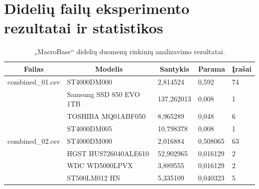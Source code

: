 \documentclass{VUMIFPSkursinis}
\begin{document}
\section{Didelių failų eksperimento rezultatai ir statistikos} \label{sec:big}

\begin{table}[H]
\centering
\caption{„MacroBase“ didelių duomenų rinkinių analizavimo rezultatai.}
\label{tab:rezBig}
{\begin{tabular}{|l|l|l|l|l|}
\hline
\multicolumn{1}{|c|}{\textbf{Failas}} & \multicolumn{1}{c|}{\textbf{Modelis}} & \multicolumn{1}{c|}{\textbf{Santykis}} & \multicolumn{1}{c|}{\textbf{Parama}} & \multicolumn{1}{c|}{\textbf{Įrašai}} \\ \hline
combined\_01.csv                      & ST4000DM000                           & 2,814524                               & 0,592                                & 74                                   \\ \hline
\cellcolor[HTML]{C0C0C0}              & Samsung SSD 850 EVO 1TB               & 137,262013                             & 0,008                                & 1                                    \\ \hline
\cellcolor[HTML]{C0C0C0}              & TOSHIBA MQ01ABF050                    & 8,965289                               & 0,048                                & 6                                    \\ \hline
\cellcolor[HTML]{C0C0C0}              & ST4000DM005                           & 10,798378                              & 0,008                                & 1                                    \\ \hline
combined\_02.csv                      & ST4000DM000                           & 2,016884                               & 0,508065                             & 63                                   \\ \hline
\cellcolor[HTML]{C0C0C0}              & HGST HUS726040ALE610                  & 52,902965                              & 0,016129                             & 2                                    \\ \hline
\cellcolor[HTML]{C0C0C0}              & WDC WD5000LPVX                        & 3,889555                               & 0,016129                             & 2                                    \\ \hline
\cellcolor[HTML]{C0C0C0}              & ST500LM012 HN                         & 5,335109                               & 0,040323                             & 5                                    \\ \hline

\end{tabular}}
\end{table}
\end{document}
